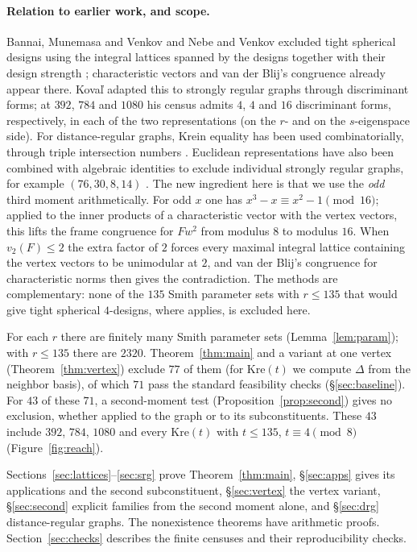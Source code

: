 \documentclass[11pt]{article}
\theoremstyle{definition}
\theoremstyle{remark}
\newcommand{\Kre}{\mathrm{Kre}}
\begin{document}
\paragraph{Relation to earlier work, and scope.}
Bannai, Munemasa and Venkov \cite{BMV} and Nebe and Venkov \cite{NV} excluded
tight spherical designs using the integral lattices spanned by the designs
together with their design strength \cite{Venkov}; characteristic vectors and
van der Blij's congruence already appear there. Kova\v l \cite{Koval}
adapted this to strongly regular graphs through discriminant forms; at
$392$, $784$ and $1080$ his census admits $4$, $4$ and $16$ discriminant forms,
respectively, in each of the two representations (on the $r$- and on the
$s$-eigenspace side). For distance-regular graphs, Krein equality has been used
combinatorially, through triple intersection numbers \cite{CJ,GVW}. Euclidean representations have also been combined with algebraic
identities to exclude individual strongly regular graphs, for example
$(76,30,8,14)$ \cite{BPR}. The new ingredient here is that we use the
\emph{odd} third moment arithmetically. For odd $x$ one has
$x^3-x\equiv x^2-1\pmod{16}$; applied to the inner products of a characteristic
vector with the vertex vectors, this lifts the frame congruence for $Fw^2$
from modulus $8$ to modulus $16$. When $v_2(F)\le2$ the extra factor of $2$
forces every maximal integral lattice containing the vertex vectors to be
unimodular at $2$, and van der Blij's congruence for
characteristic norms \cite{vdB} then gives the contradiction. The methods are
complementary: none of the $135$ Smith parameter sets with $r\le135$ that
would give tight spherical $4$-designs, where \cite{BMV} applies, is excluded
here.

For each $r$ there are finitely many Smith parameter sets
(Lemma~\ref{lem:param}); with $r\le135$ there are $2320$.
Theorem~\ref{thm:main} and a variant at one vertex (Theorem~\ref{thm:vertex})
exclude $77$ of them (for $\Kre(t)$ we compute $\Delta$ from the neighbor
basis), of which $71$ pass the standard feasibility checks
(\S\ref{sec:baseline}). For $43$ of these $71$, a second-moment test
(Proposition~\ref{prop:second}) gives no exclusion, whether applied to the
graph or to its subconstituents. These $43$ include $392$, $784$, $1080$ and every $\Kre(t)$ with $t\le135$,
$t\equiv4\pmod 8$ (Figure~\ref{fig:reach}).

Sections~\ref{sec:lattices}--\ref{sec:srg} prove Theorem~\ref{thm:main},
\S\ref{sec:apps} gives its applications and the second subconstituent, \S\ref{sec:vertex} the vertex
variant, \S\ref{sec:second} explicit families from the second moment alone, and
\S\ref{sec:drg} distance-regular graphs. The nonexistence theorems have
arithmetic proofs. Section~\ref{sec:checks} describes the finite censuses and
their reproducibility checks.
\end{document}
